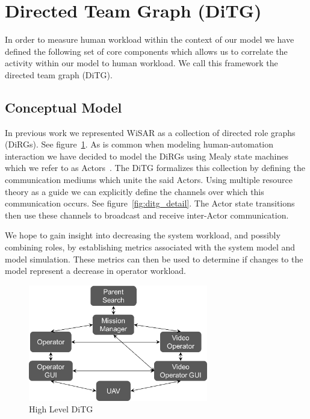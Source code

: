 \section{Directed Team Graph (DiTG)}

In order to measure human workload within the context of our model \cite{gledhill2013modelinguas} we
have defined the following set of core components which allows us to correlate
the activity within our model to human workload.  We call this framework the
directed team graph (DiTG).

\subsection{Conceptual Model}
In previous work we represented WiSAR as a collection of directed role graphs
(DiRGs)\cite{gledhill2013modelinguas}.  See figure~\ref{fig:ditg}.  As is common
when modeling human-automation interaction we have decided to model the DiRGs
using Mealy state machines which we refer to as
Actors~\cite{bolton2013litreview}.
The DiTG formalizes this collection by defining the communication mediums which
unite the said Actors.  Using multiple resource theory\cite{wickens2002multiple}
as a guide we can explicitly define the channels over which this communication occurs.  See
figure~\ref{fig:ditg_detail}.  The Actor state transitions then use these
channels to broadcast and receive inter-Actor communication.  

We hope to gain
insight into decreasing the system workload, and possibly combining roles, by
establishing metrics associated with the system model and model simulation. 
These metrics can then be used to determine if changes to the model represent a
decrease in operator workload.

\begin{figure}[h]
\center
\setlength{\abovecaptionskip}{1mm}
\setlength{\belowcaptionskip}{1mm}
\setlength{\textfloatsep}{1mm}
\setlength{\floatsep}{1mm}
\includegraphics[height=2in]{ditg.png}
\caption{High Level DiTG}
\label{fig:ditg}
\end{figure}

